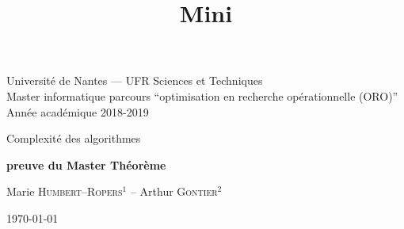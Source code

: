 \documentclass[a4paper,10pt]{article}
\title{Mini}
\begin{document}
\vspace{50mm}
{\large
\begin{center}
  Université de Nantes --- UFR Sciences et Techniques\\
  Master informatique parcours ``optimisation en recherche opérationnelle (ORO)''\\
  Année académique 2018-2019
  \vspace{30mm}
 
  { \LARGE
 
     Complexité des algorithmes\\
     \vspace{5mm}
 
     {\huge \textbf{preuve du Master Théorème}}
     \vspace{5mm}
 
     Marie \textsc{Humbert--Ropers}$^1$ --  Arthur \textsc{Gontier}$^2$
     \vspace{50mm}
  
     \today
  }  
\end{center}
}

\vfill
\break
\end{document}

